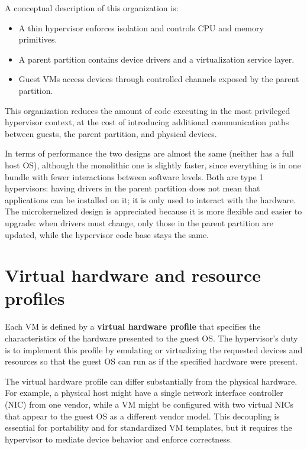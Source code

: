 A conceptual description of this organization is:

\begin{itemize}
\item A thin hypervisor enforces isolation and controls CPU and memory primitives.
\item A parent partition contains device drivers and a virtualization service layer.
\item Guest VMs access devices through controlled channels exposed by the parent partition.
\end{itemize}

This organization reduces the amount of code executing in the most privileged hypervisor context, at the cost of introducing additional communication paths between guests, the parent partition, and physical devices.

In terms of performance the two designs are almost the same (neither has a full host OS), although the monolithic one is slightly faster, since everything is in one bundle with fewer interactions between software levels. Both are type 1 hypervisors: having drivers in the parent partition does not mean that applications can be installed on it; it is only used to interact with the hardware. The microkernelized design is appreciated because it is more flexible and easier to upgrade: when drivers must change, only those in the parent partition are updated, while the hypervisor code base stays the same.

\begin{center}
\end{center}

\section{Virtual hardware and resource profiles}

Each VM is defined by a \textbf{virtual hardware profile} that specifies the characteristics of the hardware presented to the guest OS. The hypervisor's duty is to implement this profile by emulating or virtualizing the requested devices and resources so that the guest OS can run as if the specified hardware were present.

The virtual hardware profile can differ substantially from the physical hardware. For example, a physical host might have a single network interface controller (NIC) from one vendor, while a VM might be configured with two virtual NICs that appear to the guest OS as a different vendor model. This decoupling is essential for portability and for standardized VM templates, but it requires the hypervisor to mediate device behavior and enforce correctness.

